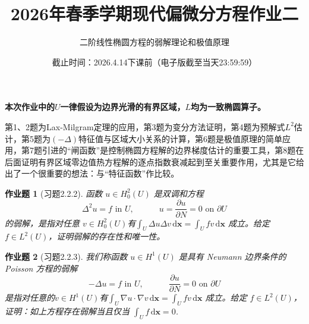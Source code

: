 \documentclass[UTF8,fontset=windows,12pt]{ctexart}
\theoremstyle{kaiti-theorem}
\newtheorem{problem}{作业题}
\numberwithin{equation}{section}
\newcommand{\bds}[1]{\boldsymbol{#1}}  %
\newcommand{\q}{\quad}
\newcommand{\p}{\partial}
\newcommand{\lap}{\Delta}
\newcommand{\nab}{\nabla}
\newcommand{\dxx}{\,\mathrm{d}\bds{x}}
\newcommand{\iu}{\int_{U}}
\begin{document}
\title{\LARGE{\bf  2026年春季学期现代偏微分方程作业二}}
\author{二阶线性椭圆方程的弱解理论和极值原理}
\date{截止时间：2026.4.14下课前（电子版截至当天23:59:59）}

\maketitle

\textbf{本次作业中的$U$一律假设为边界光滑的有界区域，$L$均为一致椭圆算子。}

第1、2题为Lax-Milgram定理的应用，第3题为变分方法证明，第4题为预解式$L^2$估计，第5题为$(-\lap)$特征值与区域大小关系的计算，第6题是极值原理的简单应用，第7题引进的“闸函数”是控制椭圆方程解的边界梯度估计的重要工具，第8题在后面证明有界区域零边值热方程解的逐点指数衰减起到至关重要作用，尤其是它给出了一个很重要的想法：与“特征函数”作比较。

\begin{problem}[习题2.2.2]
函数 $u\in H_0^2(U)$ 是双调和方程
\[
\lap^2 u=f\text{ in }U,\q\q\q u=\frac{\p u}{\p N}=0\text{ on }\p U
\]的弱解，是指对任意 $v\in H_0^2(U)$有$\iu \lap u\lap v\dxx=\iu fv\dxx$ 成立。给定 $f\in L^2(U)$，证明弱解的存在性和唯一性。
\end{problem}

\begin{problem}[习题2.2.3]  我们称函数 $u\in H^1(U)$ 是具有 Neumann 边界条件的 Poisson 方程的弱解
\[
-\lap u=f\text{ in }U,\q\q\q \frac{\p u}{\p N}=0\text{ on }\p U
\]是指对任意的$v\in H^1(U)$有$\iu \nab u\cdot\nab v\dxx=\iu fv\dxx$ 成立。给定 $f\in L^2(U)$，证明：如上方程存在弱解当且仅当 $\iu f\dxx=0$.
\end{problem}



%
\end{document}

